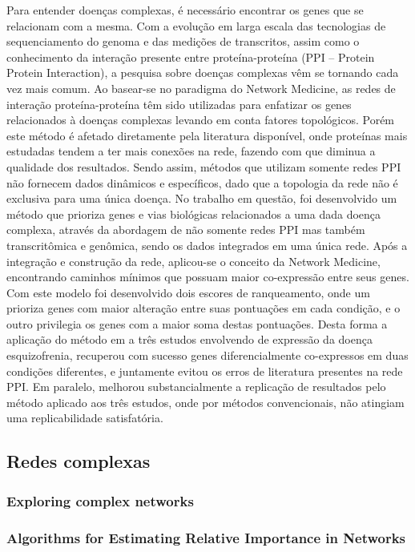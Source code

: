 Para entender doenças complexas, é necessário encontrar os genes que se relacionam com a mesma. Com a evolução em larga escala das tecnologias de sequenciamento do genoma e das medições de transcritos, assim como o conhecimento da interação presente entre proteína-proteína (PPI – Protein Protein Interaction), a pesquisa sobre doenças complexas vêm se tornando cada vez mais comum. Ao basear-se no paradigma do Network Medicine, as redes de interação proteína-proteína têm sido utilizadas para enfatizar os genes relacionados à doenças complexas levando em conta fatores topológicos. Porém este método é afetado diretamente pela literatura disponível, onde proteínas mais estudadas tendem a ter mais conexões na rede, fazendo com que diminua a qualidade dos resultados. Sendo assim, métodos que utilizam somente redes PPI não fornecem dados dinâmicos e específicos, dado que a topologia da rede não é exclusiva para uma única doença. No trabalho em questão, foi desenvolvido um método que prioriza genes e vias biológicas relacionados a uma dada doença complexa, através da abordagem de não somente redes PPI mas também transcritômica e genômica, sendo os dados integrados em uma única rede. Após a integração e construção da rede, aplicou-se o conceito da Network Medicine, encontrando caminhos mínimos que possuam maior co-expressão entre seus genes. Com este modelo foi desenvolvido dois escores de ranqueamento, onde um prioriza genes com maior alteração entre suas pontuações em cada condição, e o outro privilegia os genes com a maior soma destas pontuações. Desta forma a aplicação do método em a três estudos envolvendo de expressão da doença esquizofrenia, recuperou com sucesso genes diferencialmente co-expressos em duas condições diferentes, e juntamente evitou os erros de literatura presentes na rede PPI. Em paralelo, melhorou substancialmente a replicação de resultados pelo método aplicado aos três estudos, onde por métodos convencionais, não atingiam uma replicabilidade satisfatória.


\subsection{Redes complexas}
	\subsubsection{Exploring complex networks}
	\cite{Strogatz}
	
	\subsubsection{Algorithms for Estimating Relative Importance in Networks}
	\cite{White-Scott}
	
